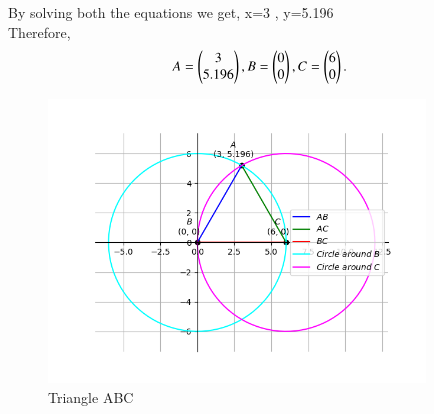 \documentclass[journal]{IEEEtran}
\begin{document}
By solving both the equations we get, x=3 , y=5.196\\
Therefore,
\begin{align}
    A=\begin{pmatrix}3\\5.196\end{pmatrix},B=\begin{pmatrix}0\\0\end{pmatrix},C=\begin{pmatrix}6\\0\end{pmatrix} .
\end{align}
\begin{figure}[htp]
	\caption{Triangle ABC}
    \centering
    \includegraphics[width=10cm]{Figure_1.png}
\end{figure}
\end{document}
